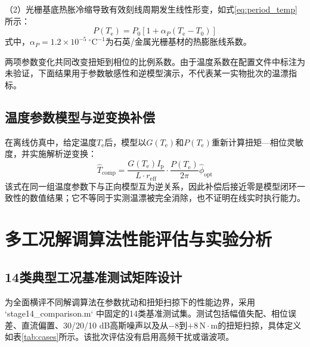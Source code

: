 \documentclass[UTF8,a4paper,12pt]{ctexart}
\begin{document}
（2）光栅基底热胀冷缩导致有效刻线周期发生线性形变，如式\eqref{eq:period_temp}所示：
\begin{equation}
P(T_{\mathrm{e}}) = P_0 \left[ 1 + \alpha_P (T_{\mathrm{e}} - T_0) \right]
\label{eq:period_temp}
\end{equation}
式中，$\alpha_P = 1.2\times 10^{-5}~^\circ\mathrm{C}^{-1}$为石英/金属光栅基材的热膨胀线系数。

两项参数变化共同改变扭矩到相位的比例系数。由于温度系数在配置文件中标注为未验证，下面结果用于参数敏感性和逆模型演示，不代表某一实物批次的温漂指标。

\subsection{温度参数模型与逆变换补偿}
在离线仿真中，给定温度$T_{\mathrm e}$后，模型以$G(T_{\mathrm e})$和$P(T_{\mathrm e})$重新计算扭矩—相位灵敏度，并实施解析逆变换：
\begin{equation}
\hat{T}_{\mathrm{comp}} = \frac{G(T_{\mathrm{e}}) I_{\mathrm{p}}}{L \cdot r_{\mathrm{eff}}} \cdot \frac{P(T_{\mathrm{e}})}{2\pi} \hat{\phi}_{\mathrm{opt}}
\label{eq:temp_comp}
\end{equation}
该式在同一组温度参数下与正向模型互为逆关系，因此补偿后接近零是模型闭环一致性的数值结果；它不等同于实测温漂被完全消除，也不证明在线实时执行能力。

\section{多工况解调算法性能评估与实验分析}

\subsection{14类典型工况基准测试矩阵设计}
为全面横评不同解调算法在参数扰动和扭矩扫掠下的性能边界，采用 `stage14\_comparison.m` 中固定的14类基准测试集。测试包括幅值失配、相位误差、直流偏置、30/20/10 dB高斯噪声以及从$-8$到$+8\,\mathrm{N\cdot m}$的扭矩扫掠，具体定义如表\ref{tab:cases}所示。该批次评估没有启用高频干扰或谐波项。
\end{document}
